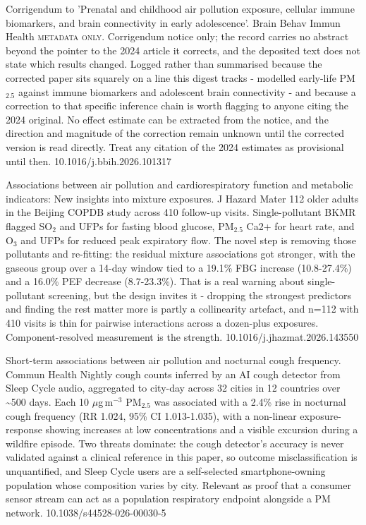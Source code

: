 \documentclass[10pt]{article}
\begin{document}
{Corrigendum to 'Prenatal and childhood air pollution exposure, cellular immune biomarkers, and brain connectivity in early adolescence'.}
{Brain Behav Immun Health}
{\textsc{metadata only.} Corrigendum notice only; the record carries no abstract beyond the pointer to the 2024 article it corrects, and the deposited text does not state which results changed. Logged rather than summarised because the corrected paper sits squarely on a line this digest tracks - modelled early-life PM$_{2.5}$ against immune biomarkers and adolescent brain connectivity - and because a correction to that specific inference chain is worth flagging to anyone citing the 2024 original. No effect estimate can be extracted from the notice, and the direction and magnitude of the correction remain unknown until the corrected version is read directly. Treat any citation of the 2024 estimates as provisional until then.}
{10.1016/j.bbih.2026.101317}


{Associations between air pollution and cardiorespiratory function and metabolic indicators: New insights into mixture exposures.}
{J Hazard Mater}
{112 older adults in the Beijing COPDB study across 410 follow-up visits. Single-pollutant BKMR flagged SO$_2$ and UFPs for fasting blood glucose, PM$_{2.5}$ Ca2+ for heart rate, and O$_3$ and UFPs for reduced peak expiratory flow. The novel step is removing those pollutants and re-fitting: the residual mixture associations got stronger, with the gaseous group over a 14-day window tied to a 19.1\% FBG increase (10.8-27.4\%) and a 16.0\% PEF decrease (8.7-23.3\%). That is a real warning about single-pollutant screening, but the design invites it - dropping the strongest predictors and finding the rest matter more is partly a collinearity artefact, and n=112 with 410 visits is thin for pairwise interactions across a dozen-plus exposures. Component-resolved measurement is the strength.}
{10.1016/j.jhazmat.2026.143550}


{Short-term associations between air pollution and nocturnal cough frequency.}
{Commun Health}
{Nightly cough counts inferred by an AI cough detector from Sleep Cycle audio, aggregated to city-day across 32 cities in 12 countries over \textasciitilde{}500 days. Each 10 $\mu$g\,m$^{-3}$ PM$_{2.5}$ was associated with a 2.4\% rise in nocturnal cough frequency (RR 1.024, 95\% CI 1.013-1.035), with a non-linear exposure-response showing increases at low concentrations and a visible excursion during a wildfire episode. Two threats dominate: the cough detector's accuracy is never validated against a clinical reference in this paper, so outcome misclassification is unquantified, and Sleep Cycle users are a self-selected smartphone-owning population whose composition varies by city. Relevant as proof that a consumer sensor stream can act as a population respiratory endpoint alongside a PM network.}
{10.1038/s44528-026-00030-5}
\end{document}
